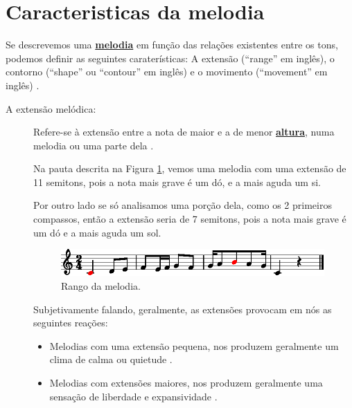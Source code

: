 \section{Caracteristicas da melodia}
\label{sec:caracteristicas:melodia}


Se descrevemos uma \hyperref[sec:pos:Melodia]{\textbf{melodia}} em função das relações existentes entre os tons,
podemos definir as seguintes caraterísticas: 
A extensão (``range'' em inglês),
o contorno  (``shape'' ou ``contour'' em inglês) e 
o movimento  (``movement'' em inglês) 
\cite[pp. 43]{holland2013music} \cite[pp. 50]{langer2017theory}.

\begin{description}
\item[A extensão melódica:] 
\label{ref:melodica:range}
Refere-se à extensão entre a nota de maior 
e a de menor \hyperref[sec:pos:Altura]{\textbf{altura}},
 numa melodia ou uma parte dela \cite[pp. 43]{holland2013music}.

\begin{example}
Na pauta descrita na Figura \ref{fig:melody:range:1}, 
vemos uma melodia com uma extensão de 11 semitons, pois a nota mais grave é um dó,
e a mais aguda um si.

Por outro lado se só analisamos uma porção dela, como os 2 primeiros compassos,
então a extensão seria de 7 semitons, pois a nota mais grave é um dó e a mais aguda um sol.
\end{example}
\begin{figure}[!h]
\centering
\includegraphics[width=0.99\textwidth]{chapters/cap-musicalidade-percepcion/melodia-carateristicas-range.eps}
\caption{Rango da melodia.}
\label{fig:melody:range:1}
\end{figure}

Subjetivamente falando, geralmente, as extensões provocam em nós as seguintes reações:
\begin{itemize}
\item Melodias com uma extensão pequena, nos produzem geralmente um clima de calma ou quietude
 \cite[pp. 43]{holland2013music}.
\item Melodias com extensões maiores, nos produzem geralmente uma sensação de liberdade e expansividade
 \cite[pp. 43]{holland2013music}.
\end{itemize}


\end{description}
